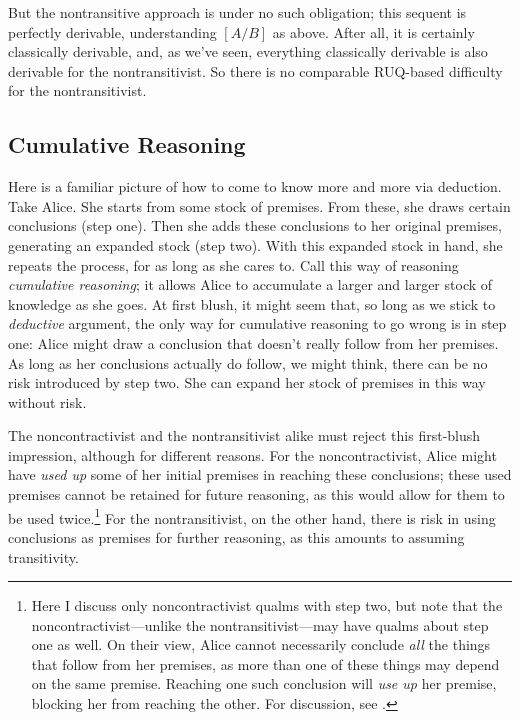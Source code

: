 \documentclass{ergoclass}
\newcommand{\rall}[3]{\ensuremath{#1[#2/#3]}}
\renewcommand{\cite}{\citet}						%
\begin{document}
But the nontransitive approach is under no such obligation; this sequent is perfectly derivable, understanding $\rall{}{A}{B}$ as above. After all, it is certainly classically derivable, and, as we've seen, everything classically derivable is also derivable for the nontransitivist. So there is no comparable RUQ-based difficulty for the nontransitivist.


\subsection{Cumulative Reasoning}

Here is a familiar picture of how to come to know more and more via deduction. Take Alice. She starts from some stock of premises. From these, she draws certain conclusions (step one). Then she adds these conclusions to her original premises, generating an expanded stock (step two). With this expanded stock in hand, she repeats the process, for as long as she cares to. Call this way of reasoning {\em cumulative reasoning}; it allows Alice to accumulate a larger and larger stock of knowledge as she goes. At first blush, it might seem that, so long as we stick to {\em deductive} argument, the only way for cumulative reasoning to go wrong is in step one: Alice might draw a conclusion that doesn't really follow from her premises. As long as her conclusions actually do follow, we might think, there can be no risk introduced by step two. She can expand her stock of premises in this way without risk. 

The noncontractivist and the nontransitivist alike must reject this first-blush impression, although for different reasons. For the noncontractivist, Alice might have {\em used up} some of her initial premises in reaching these conclusions; these used premises cannot be retained for future reasoning, as this would allow for them to be used twice.\footnote{Here I discuss only noncontractivist qualms with step two, but note that the noncontractivist---unlike the nontransitivist---may have qualms about step one as well. On their view, Alice cannot necessarily conclude {\em all} the things that follow from her premises, as more than one of these things may depend on the same premise. Reaching one such conclusion will {\em use up} her premise, blocking her from reaching the other. For discussion, see \cite{cp:imct}.} For the nontransitivist, on the other hand, there is risk in using conclusions as premises for further reasoning, as this amounts to assuming transitivity.
\end{document}
